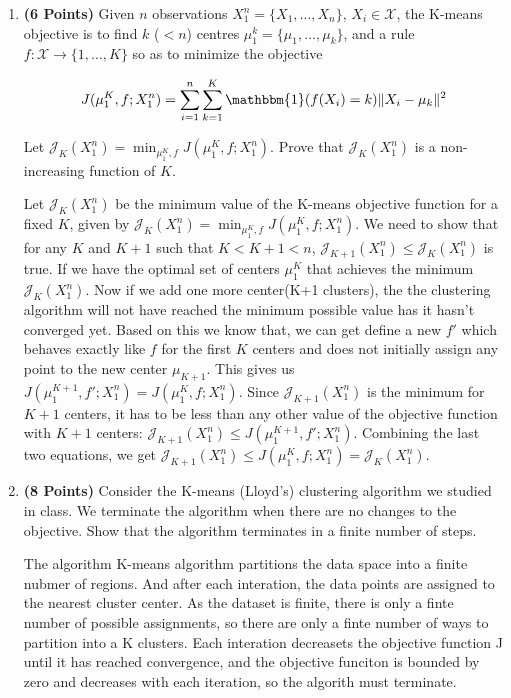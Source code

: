 \documentclass[a4paper]{article}
\newcounter{thm}
\newcommand{\Xcal}{\mathcal{X}}
\newcommand{\Jcal}{\mathcal{J}}
\newcommand{\indfone}{\mathbbm{1}}
\theoremstyle{definition}
\newenvironment{soln}{
    \leavevmode\color{blue}\ignorespaces
}{}
\begin{document}
\begin{enumerate}

\item \textbf{(6 Points)}
Given $n$ observations $X_1^n = \{X_1, \dots, X_n\}$, $X_i \in \Xcal$, the K-means objective
is to find $k$
($<n$) centres $\mu_1^k = \{\mu_1, \dots, \mu_k\}$, and a rule $f:\Xcal \rightarrow
\{1,\dots, K\}$ so as to minimize the objective

\begin{equation}
J(\mu_1^K, f; X_1^n) = \sum_{i=1}^n \sum_{k=1}^K \indfone(f(X_i) = k) \|X_i - \mu_k\|^2
\label{eqn:kmeans}
\end{equation}

Let $\Jcal_K(X_1^n) = \min_{\mu_1^K, f} J(\mu_1^K, f; X_1^n)$. Prove that
$\Jcal_{K}(X_1^n)$ is a non-increasing function of $K$.

\begin{soln}
  Let \( \Jcal_K(X_1^n) \) be the minimum value of the K-means objective function for a fixed \( K \), given by $
      \Jcal_K(X_1^n) = \min_{\mu_1^K, f} J(\mu_1^K, f; X_1^n)$.
  We need to show that for any \( K \) and \( K+1 \) such that \( K < K+1 < n \), $\Jcal_{K+1}(X_1^n) \leq \Jcal_K(X_1^n)$
  is true. If we have the optimal set of centers \( \mu_1^K \) that achieves the minimum \( \Jcal_K(X_1^n) \). Now if we add one
  more center(K+1 clusters), the the clustering algorithm will not have reached the minimum possible value has it hasn't
  converged yet. Based on this we know that, we can get define  a new \( f' \) which behaves exactly like \( f \) for the first \( K \) centers and does not initially assign 
  any point to the new center \( \mu_{K+1} \). This gives us $J(\mu_1^{K+1}, f'; X_1^n) = J(\mu_1^K, f; X_1^n)$. Since \( \Jcal_{K+1}(X_1^n) \) is 
  the minimum for \( K+1 \) centers, it has to be less than any other value of the objective function with \( K+1 \) 
  centers: $\Jcal_{K+1}(X_1^n) \leq J(\mu_1^{K+1}, f'; X_1^n)$. Combining the last two equations, 
  we get $\Jcal_{K+1}(X_1^n) \leq J(\mu_1^K, f; X_1^n) = \Jcal_K(X_1^n)$.

\end{soln}

\item \textbf{(8 Points)}
Consider the K-means (Lloyd's) clustering algorithm we studied in class. We
terminate the algorithm when there are no changes to the objective.
Show that the algorithm terminates in a finite number of steps.

\begin{soln}
    The algorithm K-means algorithm partitions the data space into a finite nubmer of regions. And after each interation,
    the data points are assigned to the nearest cluster center. As the dataset is finite, there is only a finte number
    of possible assignments, so there are only a finte number of ways to partition into a K clusters. 
    Each interation decreasets the objective function J until it has reached convergence, and the objective funciton is 
    bounded by zero and decreases with each iteration, so the algorith must terminate.
\end{soln}



\end{enumerate}
\end{document}
